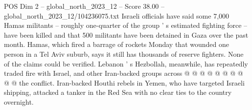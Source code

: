 \begin{textsample}{POS Dim 2 – global\_north\_2023\_12 – Score 38.00 – global\_north\_2023\_12/104236075.txt}
Israeli officials have said some 7,000 Hamas militants -- roughly one-quarter of the group ' s estimated fighting force -- have been killed and that 500 militants have been detained in Gaza over the past month.
Hamas, which fired a barrage of rockets Monday that wounded one person in a Tel Aviv suburb, says it still has thousands of reserve fighters.
None of the claims could be verified.
Lebanon ' s Hezbollah, meanwhile, has repeatedly traded fire with Israel, and other Iran-backed groups across @ @ @ @ @ @ @ @ @ @ the conflict.
Iran-backed Houthi rebels in Yemen, who have targeted Israeli shipping, attacked a tanker in the Red Sea with no clear ties to the country overnight.

\end{textsample}
